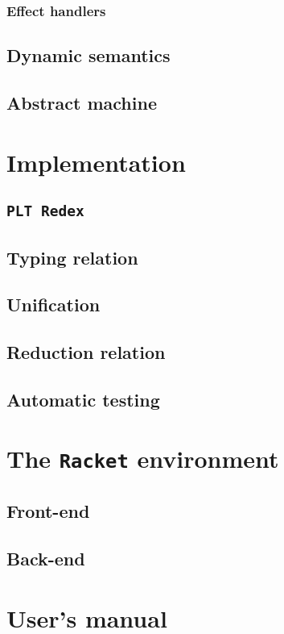\documentclass[inz, english, shortabstract]{iithesis}
\newcommand{\Redex}{\texttt{PLT Redex} }
\newcommand{\Racket}{\texttt{Racket} }
\begin{document}
\subsection{Effect handlers}


\section{Dynamic semantics}

\section{Abstract machine}


\chapter{Implementation}

\section{\Redex}

\section{Typing relation}

\section{Unification}

\section{Reduction relation}

\section{Automatic testing}


\chapter{The \Racket environment}

\section{Front-end}

\section{Back-end}

\chapter{User's manual}

\printbibliography

\end{document}

